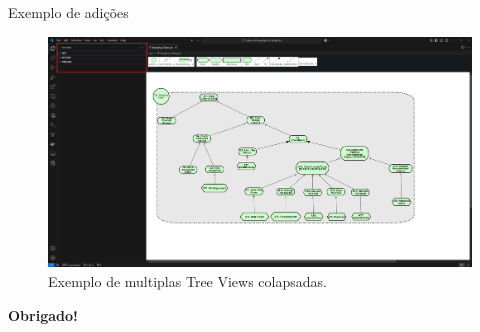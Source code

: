 \documentclass{beamer}
\begin{document}
\begin{frame}{Exemplo de adições}
  \begin{figure}[!h]
    \centering
    \includegraphics[width=1\textwidth]{multiple sections example.png} 
    \caption{Exemplo de multiplas Tree Views colapsadas.}
  \end{figure}
\end{frame}



\begin{frame}{}
    \vspace{1cm}\hspace{5cm}\textbf{Obrigado!}
\end{frame}
\end{document}
